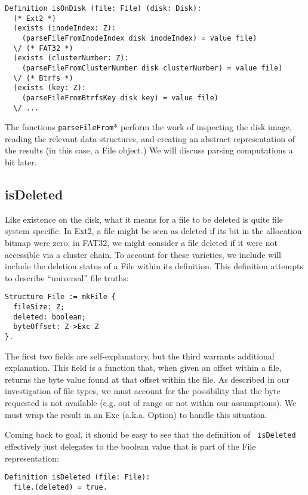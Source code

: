 \documentclass[nocopyrightspace]{sigplanconf}
\begin{document}
\begin{lstlisting}
Definition isOnDisk (file: File) (disk: Disk):
  (* Ext2 *)
  (exists (inodeIndex: Z):
    (parseFileFromInodeIndex disk inodeIndex) = value file)
  \/ (* FAT32 *)
  (exists (clusterNumber: Z):
    (parseFileFromClusterNumber disk clusterNumber) = value file)
  \/ (* Btrfs *)
  (exists (key: Z):
    (parseFileFromBtrfsKey disk key) = value file)
  \/ ...
\end{lstlisting}

The functions {\tt parseFileFrom}* perform the work of inspecting the disk
image, reading the relevant data structures, and creating an abstract
representation of the results (in this case, a File object.) We will discuss
parsing computations a bit later.

\subsection{isDeleted}

Like existence on the disk, what it means for a file to be deleted is quite
file system specific. In Ext2, a file might be seen as deleted if its bit in
the allocation bitmap were zero; in FAT32, we might consider a file deleted if
it were not accessible via a cluster chain. To account for these varieties, we
include will include the deletion status of a File within its definition. This
definition attempts to describe ``universal'' file truths:

\begin{lstlisting}
Structure File := mkFile {
  fileSize: Z;
  deleted: boolean;
  byteOffset: Z->Exc Z
}.
\end{lstlisting}

The first two fields are self-explanatory, but the third warrants additional
explanation. This field is a function that, when given an offset within a
file, returns the byte value found at that offset within the file. As
described in our investigation of file types, we must account for the
possibility that the byte requested is not available (e.g. out of range or not
within our assumptions). We must wrap the result in an Exc (a.k.a. Option) to
handle this situation.

Coming back to goal, it should be easy to see that the definition of {\tt
isDeleted} effectively just delegates to the boolean value that is part of the
File representation:

\begin{lstlisting}
Definition isDeleted (file: File):
  file.(deleted) = true.
\end{lstlisting}
\end{document}
